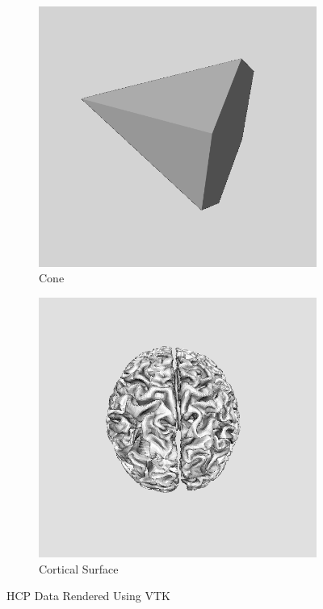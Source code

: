 \documentclass[MSc,paper=a4,pagesize=auto]{icldt}
\begin{document}
\begin{figure}[htbp!]
\centering
\begin{subfigure}{0.5\textwidth}
    \centering
    \includegraphics[width=0.8\linewidth]{resources/cone}
    \caption{Cone}
	\label{fig:sub1}
\end{subfigure}%
\centering
\begin{subfigure}{0.5\textwidth}
    \centering
    \includegraphics[width=0.8\linewidth]{resources/cortical_surface}
    \caption{Cortical Surface}
	\label{fig:sub2}
\end{subfigure}    
    \caption{HCP Data Rendered Using VTK}
    \label{fig:data_sources}
\end{figure}
\end{document}
